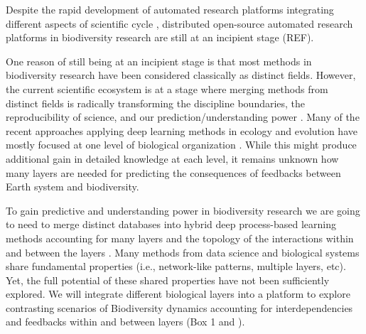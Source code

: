 \documentclass[authoryear,1p,12pt]{elsarticle}
\begin{document}
Despite the rapid development of automated research platforms integrating different aspects of scientific cycle \cite{NakamotoT,BigQuery,AutomatedStatistician,Modulus,GAI,Iris,easeml}, distributed open-source automated research platforms in biodiversity research are still at an incipient stage (REF).

One reason of still being at an incipient stage is that
most methods in biodiversity research have been
considered classically as distinct fields. However, the current
scientific ecosystem is at a stage where merging methods from
distinct fields is radically transforming the discipline boundaries,
the reproducibility of science, and our prediction/understanding
power \cite{Reichsteietal2019}.
Many of the recent approaches applying
deep learning methods in ecology and evolution have mostly focused at
one level of biological organization \cite{Sheehan2016}. While this might produce
additional gain in detailed knowledge at each level, it remains
unknown how many layers are needed for predicting the
consequences of feedbacks between Earth system and biodiversity.

To gain predictive and understanding power in biodiversity
research we are going to need to merge distinct databases into hybrid
deep process-based learning methods accounting for many layers and the
topology of the interactions within and between the
layers \cite{Melian2018}. Many methods
from data science and biological systems share fundamental properties
(i.e., network-like patterns, multiple layers, etc). Yet, the full
potential of these shared properties have not been sufficiently
explored. We will
integrate different biological layers into a platform to explore
contrasting scenarios of Biodiversity dynamics accounting for
interdependencies and feedbacks within and between layers (Box 1 and
).
\end{document}
